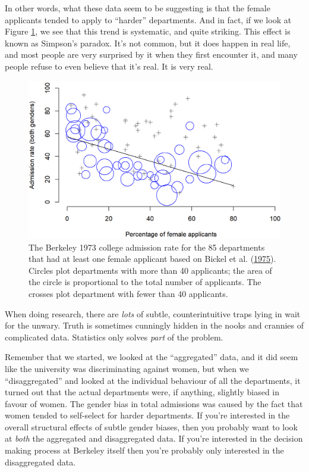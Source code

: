 \documentclass[
  11pt,
  a4paper,
  twoside,symmetric,openright]{book}
\theoremstyle{break}
\theoremstyle{break}
\begin{document}
In other words, what these data seem to be suggesting is that the female applicants tended to apply to ``harder'' departments. And in fact, if we look at Figure \ref{fig:berkeley}, we see that this trend is systematic, and quite striking. This effect is known as Simpson's paradox. It's not common, but it does happen in real life, and most people are very surprised by it when they first encounter it, and many people refuse to even believe that it's real. It is very real.

\begin{figure}

{\centering \includegraphics[width=0.6\linewidth]{resources/image/berkeley} 

}

\caption[The Berkeley 1973 college admissions data.]{The Berkeley 1973 college admission rate for the 85 departments that had at least one female applicant based on Bickel et al. (\protect\hyperlink{ref-Bickel1975}{1975}). Circles plot departments with more than 40 applicants; the area of the circle is proportional to the total number of applicants. The crosses plot department with fewer than 40 applicants.}\label{fig:berkeley}
\end{figure}



When doing research, there are \emph{lots} of subtle, counterintuitive traps lying in wait for the unwary. Truth is sometimes cunningly hidden in the nooks and crannies of complicated data. Statistics only solves \emph{part} of the problem.

Remember that we started, we looked at the ``aggregated'' data, and it did seem like the university was discriminating against women, but when we ``disaggregated'' and looked at the individual behaviour of all the departments, it turned out that the actual departments were, if anything, slightly biased in favour of women. The gender bias in total admissions was caused by the fact that women tended to self-select for harder departments. If you're interested in the overall structural effects of subtle gender biases, then you probably want to look at \emph{both} the aggregated and disaggregated data. If you're interested in the decision making process at Berkeley itself then you're probably only interested in the disaggregated data.
\end{document}
